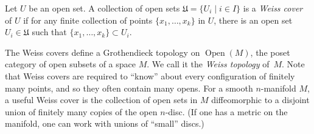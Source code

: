\documentclass[11pt]{amsart}
\def\mcol{\, | \,}
\def\Open{\operatorname{Open}}
\begin{document}
\begin{dfn}
Let $U$ be an open set. A collection of open sets $\mathfrak{U} = \{ U_i \mid i \in I\}$ is a {\em Weiss cover} of $U$ if for any finite collection of points $\{x_1,\ldots,x_k\}$ in $U$, there is an open set $U_i \in \mathfrak{U}$ such that $\{x_1,\ldots,x_k\} \subset U_i$.
\end{dfn}

The Weiss covers define a Grothendieck topology on $\Open(M)$, the poset category of open subsets of a space $M$. We call it the {\em Weiss topology} of~$M$. 
Note that Weiss covers are required to ``know'' about every configuration of finitely many points,
and so they often contain many opens.
For a smooth $n$-manifold $M$, a useful Weiss cover is the collection of open sets in $M$ diffeomorphic to a disjoint union of finitely many copies of the open $n$-disc.
(If one has a metric on the manifold, one can work with unions of ``small'' discs.)


%
\end{document}
